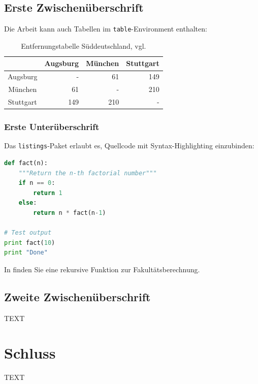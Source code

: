 \subsection{Erste Zwischenüberschrift}
\label{sec:ErsteZwischenueberschrift}
Die Arbeit kann auch Tabellen im \texttt{table}-Environment enthalten:
\begin{table}[ht]
  \centering
  \caption{Entfernungstabelle Süddeutschland, vgl. \cite{entfernungstabelle}}
  \begin{tabular}{c r r r}
    \toprule
              & Augsburg & München & Stuttgart \\
    \midrule
    Augsburg  & -        & 61      & 149       \\
    München   & 61       & -       & 210       \\
    Stuttgart & 149      & 210     & -         \\
    \bottomrule
  \end{tabular}
  \label{tab:entfernungen}
\end{table}

\subsubsection{Erste Unterüberschrift}
\label{sec:ErsteUnterueberschrift}

Das \texttt{listings}-Paket erlaubt es, Quellcode mit Syntax-Highlighting einzubinden:

\begin{lstlisting}[language=Python,float=ht,caption={Python-Programm zur Berechnung der Fakultätsfunktion},label=lst:factorial]
def fact(n):
    """Return the n-th factorial number"""
    if n == 0:
        return 1
    else:
        return n * fact(n-1)
  
# Test output
print fact(10)
print "Done"
\end{lstlisting}

In  finden Sie eine rekursive Funktion zur Fakultätsberechnung.
  
\subsection{Zweite Zwischenüberschrift}
\label{sec:ZweiteZwischenueberschrift}

TEXT

\section{Schluss}
\label{sec:Schluss}

TEXT

\printbibliography[heading=bibintoc]





